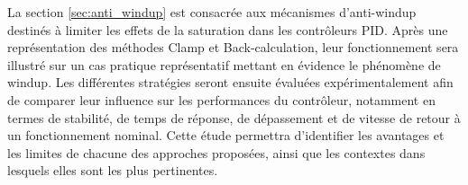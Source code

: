 La section \ref{sec:anti_windup} est consacrée aux mécanismes d'anti-windup destinés à limiter les effets de la saturation dans les contrôleurs PID. Après une représentation des méthodes Clamp et Back-calculation, leur fonctionnement sera illustré sur un cas pratique représentatif mettant en évidence le phénomène de windup. Les différentes stratégies seront ensuite évaluées expérimentalement afin de comparer leur influence sur les performances du contrôleur, notamment en termes de stabilité, de temps de réponse, de dépassement et de vitesse de retour à un fonctionnement nominal. Cette étude permettra d'identifier les avantages et les limites de chacune des approches proposées, ainsi que les contextes dans lesquels elles sont les plus pertinentes. \\





